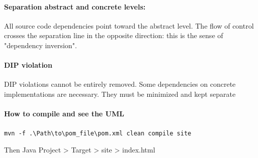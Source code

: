 \paragraph{Separation abstract and concrete levels:}  All source code
dependencies point toward the abstract level. The flow of control crosses the
separation line in the opposite direction: this is the sense of "dependency
inversion".

\paragraph{DIP violation}
DIP violations cannot be entirely removed. Some dependencies on concrete
implementations are necessary. They must be minimized and kept separate


\paragraph{How to compile and see the UML}
\verb|mvn -f .\Path\to\pom_file\pom.xml clean compile site|

Then Java Project > Target > site > index.html


